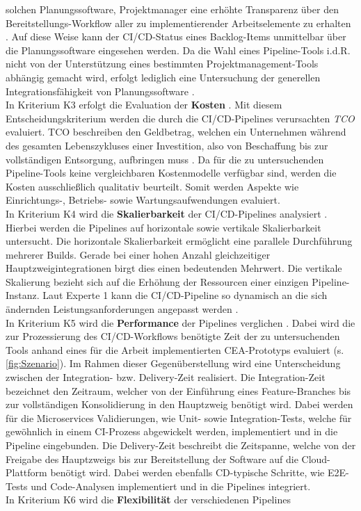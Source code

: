 solchen Planungssoftware, Projektmanager eine erhöhte Transparenz über den Bereitstellungs-Workflow aller zu implementierender Arbeitselemente zu erhalten \cite[Z. 96 ff.]{TestDeveloperSAPHyperspaceAdoption&Onboarding.}. Auf diese Weise kann der CI/CD-Status eines Backlog-Items unmittelbar über die Planungssoftware eingesehen werden. Da die Wahl eines Pipeline-Tools i.d.R. nicht von der Unterstützung eines bestimmten Projektmanagement-Tools abhängig gemacht wird, erfolgt lediglich eine Untersuchung der generellen Integrationsfähigkeit von Planungssoftware \cite[Z. 96 ff.]{TestDeveloperSAPHyperspaceAdoption&Onboarding.}.\\In Kriterium K3 erfolgt die Evaluation der \textbf{Kosten} \cite[Z. 42 ff.]{ProductManagerSAPHyperspaceCICD.}. Mit diesem Entscheidungskriterium werden die durch die CI/CD-Pipelines verursachten \textit{\ac{TCO}} evaluiert. TCO beschreiben den Geldbetrag, welchen ein Unternehmen während des gesamten Lebenszykluses einer Investition, also von Beschaffung bis zur vollständigen Entsorgung, aufbringen muss \cite[4]{Ellram.1993}. Da für die zu untersuchenden Pipeline-Tools keine vergleichbaren Kostenmodelle verfügbar sind, werden die Kosten ausschließlich qualitativ beurteilt. Somit werden Aspekte wie Einrichtungs-, Betriebs- sowie Wartungsaufwendungen evaluiert. \\In Kriterium K4 wird die \textbf{Skalierbarkeit} der CI/CD-Pipelines analysiert \cite[Z. 69 ff.]{ProductOwnerSAPBTPProd&Infra.}. Hierbei werden die Pipelines auf horizontale sowie vertikale Skalierbarkeit untersucht. Die horizontale Skalierbarkeit ermöglicht eine parallele Durchführung mehrerer Builds. Gerade bei einer hohen Anzahl gleichzeitiger Hauptzweigintegrationen birgt dies einen bedeutenden Mehrwert. Die vertikale Skalierung bezieht sich auf die Erhöhung der Ressourcen einer einzigen Pipeline-Instanz. Laut Experte 1 kann die CI/CD-Pipeline so dynamisch an die sich ändernden Leistungsanforderungen angepasst werden \cite[Z. 74 ff.]{ProductOwnerSAPBTPProd&Infra.}. \\In Kriterium K5 wird die \textbf{Performance} der Pipelines verglichen \cite[Z. 35 ff.]{ProductManagerSAPHyperspaceCICD.}. Dabei wird die zur Prozessierung des CI/CD-Workflows benötigte Zeit der zu untersuchenden Tools anhand eines für die Arbeit implementierten CEA-Prototyps evaluiert (s. \ref{fig:Szenario}). Im Rahmen dieser Gegenüberstellung wird eine Unterscheidung zwischen der Integration- bzw. Delivery-Zeit realisiert. Die Integration-Zeit bezeichnet den Zeitraum, welcher von der Einführung eines Feature-Branches bis zur vollständigen Konsolidierung in den Hauptzweig benötigt wird. Dabei werden für die Microservices Validierungen, wie Unit- sowie Integration-Tests, welche für gewöhnlich in einem CI-Prozess abgewickelt werden, implementiert und in die Pipeline eingebunden. Die Delivery-Zeit beschreibt die Zeitspanne, welche von der Freigabe des Hauptzweigs bis zur Bereitstellung der Software auf die Cloud-Plattform benötigt wird. Dabei werden ebenfalls CD-typische Schritte, wie E2E-Tests und Code-Analysen implementiert und in die Pipelines integriert.\\ In Kriterium K6 wird die \textbf{Flexibilität} der verschiedenen Pipelines 